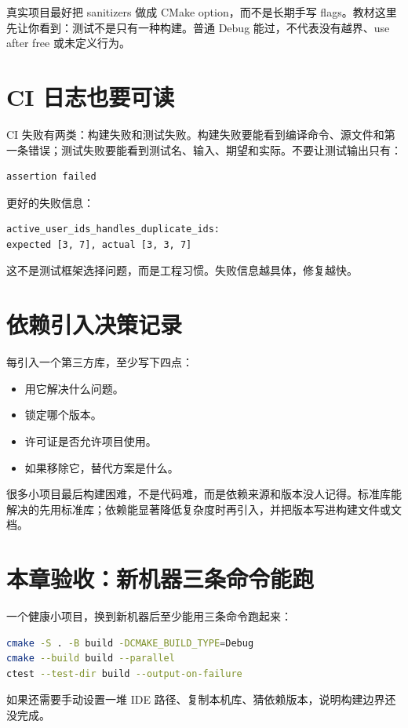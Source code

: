 真实项目最好把 sanitizers 做成 CMake option，而不是长期手写 flags。教材这里先让你看到：测试不是只有一种构建。普通 Debug 能过，不代表没有越界、use after free 或未定义行为。

\section{CI 日志也要可读}

CI 失败有两类：构建失败和测试失败。构建失败要能看到编译命令、源文件和第一条错误；测试失败要能看到测试名、输入、期望和实际。不要让测试输出只有：

\begin{lstlisting}[caption={低质量失败信息}]
assertion failed
\end{lstlisting}

更好的失败信息：

\begin{lstlisting}[caption={可诊断失败信息}]
active_user_ids_handles_duplicate_ids:
expected [3, 7], actual [3, 3, 7]
\end{lstlisting}

这不是测试框架选择问题，而是工程习惯。失败信息越具体，修复越快。

\section{依赖引入决策记录}

每引入一个第三方库，至少写下四点：

\begin{itemize}
  \item 用它解决什么问题。
  \item 锁定哪个版本。
  \item 许可证是否允许项目使用。
  \item 如果移除它，替代方案是什么。
\end{itemize}

很多小项目最后构建困难，不是代码难，而是依赖来源和版本没人记得。标准库能解决的先用标准库；依赖能显著降低复杂度时再引入，并把版本写进构建文件或文档。

\section{本章验收：新机器三条命令能跑}

一个健康小项目，换到新机器后至少能用三条命令跑起来：

\begin{lstlisting}[language=bash,caption={新机器验收命令}]
cmake -S . -B build -DCMAKE_BUILD_TYPE=Debug
cmake --build build --parallel
ctest --test-dir build --output-on-failure
\end{lstlisting}

如果还需要手动设置一堆 IDE 路径、复制本机库、猜依赖版本，说明构建边界还没完成。
